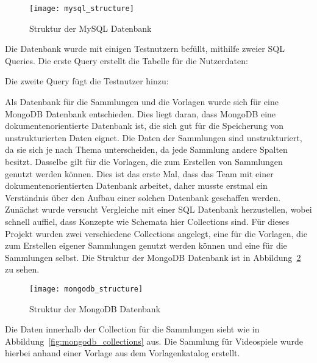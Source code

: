 \newpage
\begin{figure}[h]
    \centering
    \texttt{[image: mysql\_structure]}
    \caption{Struktur der MySQL Datenbank}
    \label{fig:mysql_structure}
\end{figure}

Die Datenbank wurde mit einigen Testnutzern befüllt, mithilfe zweier SQL Queries.
Die erste Query erstellt die Tabelle für die Nutzerdaten:

\vspace{1em}

\vspace{1em}

Die zweite Query fügt die Testnutzer hinzu:

\vspace{1em}

\vspace{1em}

Als Datenbank für die Sammlungen und die Vorlagen wurde sich für eine MongoDB Datenbank entschieden.
Dies liegt daran, dass MongoDB eine dokumentenorientierte Datenbank ist, die sich gut für die Speicherung von unstrukturierten Daten eignet.
Die Daten der Sammlungen sind unstrukturiert, da sie sich je nach Thema unterscheiden, da jede Sammlung andere Spalten besitzt.
Dasselbe gilt für die Vorlagen, die zum Erstellen von Sammlungen genutzt werden können.
Dies ist das erste Mal, dass das Team mit einer dokumentenorientierten Datenbank arbeitet, daher musste erstmal ein Verständnis über den Aufbau einer solchen Datenbank geschaffen werden.
Zunächst wurde versucht Vergleiche mit einer SQL Datenbank herzustellen, wobei schnell auffiel, dass Konzepte wie Schemata hier Collections sind.
Für dieses Projekt wurden zwei verschiedene Collections angelegt, eine für die Vorlagen, die zum Erstellen eigener Sammlungen genutzt werden können und eine für die Sammlungen selbst.
Die Struktur der MongoDB Datenbank ist in Abbildung~\ref{fig:mongodb_structure} zu sehen.

\begin{figure}[h]
    \centering
    \texttt{[image: mongodb\_structure]}
    \caption{Struktur der MongoDB Datenbank}
    \label{fig:mongodb_structure}
\end{figure}

Die Daten innerhalb der Collection für die Sammlungen sieht wie in Abbildung~\ref{fig:mongodb_collections} aus.
Die Sammlung für Videospiele wurde hierbei anhand einer Vorlage aus dem Vorlagenkatalog erstellt.

